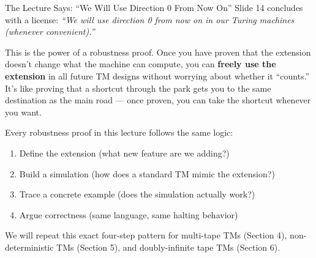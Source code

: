 \begin{notebox}{The Lecture Says: ``We Will Use Direction 0 From Now On''}
Slide 14 concludes with a license: \textit{``We will use direction 0 from now on in our Turing machines (whenever convenient).''}

This is the power of a robustness proof. Once you have proven that the extension doesn't change what the machine can compute, you can \textbf{freely use the extension} in all future TM designs without worrying about whether it ``counts.'' It's like proving that a shortcut through the park gets you to the same destination as the main road --- once proven, you can take the shortcut whenever you want.

Every robustness proof in this lecture follows the same logic:
\begin{enumerate}[nosep]
\item Define the extension (what new feature are we adding?)
\item Build a simulation (how does a standard TM mimic the extension?)
\item Trace a concrete example (does the simulation actually work?)
\item Argue correctness (same language, same halting behavior)
\end{enumerate}

We will repeat this exact four-step pattern for multi-tape TMs (Section 4), non-deterministic TMs (Section 5), and doubly-infinite tape TMs (Section 6).
\end{notebox}


